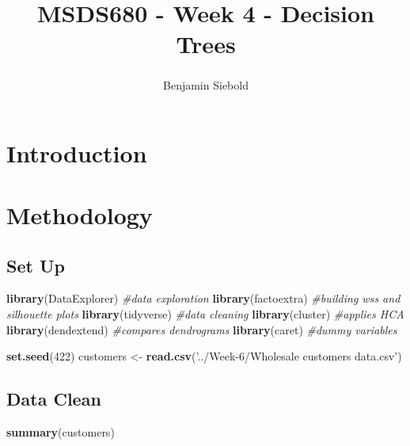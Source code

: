 \documentclass[
  english,
  man]{apa6}
\title{MSDS680 - Week 4 - Decision Trees}
\author{Benjamin Siebold\textsuperscript{}}
\date{}
\affiliation{\vspace{0.5cm}\textsuperscript{} Regis University}
\newenvironment{Shaded}{\begin{snugshade}}{\end{snugshade}}
\newcommand{\CommentTok}[1]{\textcolor[rgb]{0.56,0.35,0.01}{\textit{#1}}}
\newcommand{\DecValTok}[1]{\textcolor[rgb]{0.00,0.00,0.81}{#1}}
\newcommand{\KeywordTok}[1]{\textcolor[rgb]{0.13,0.29,0.53}{\textbf{#1}}}
\newcommand{\NormalTok}[1]{#1}
\newcommand{\StringTok}[1]{\textcolor[rgb]{0.31,0.60,0.02}{#1}}
\begin{document}
\maketitle

\hypertarget{introduction}{%
\section{Introduction}\label{introduction}}

\hypertarget{methodology}{%
\section{Methodology}\label{methodology}}

\hypertarget{set-up}{%
\subsection{Set Up}\label{set-up}}

\begin{Shaded}
\begin{Highlighting}[]
\KeywordTok{library}\NormalTok{(DataExplorer) }\CommentTok{#data exploration}
\KeywordTok{library}\NormalTok{(factoextra) }\CommentTok{#building wss and silhouette plots}
\KeywordTok{library}\NormalTok{(tidyverse) }\CommentTok{#data cleaning}
\KeywordTok{library}\NormalTok{(cluster) }\CommentTok{#applies HCA}
\KeywordTok{library}\NormalTok{(dendextend) }\CommentTok{#compares dendrograms}
\KeywordTok{library}\NormalTok{(caret) }\CommentTok{#dummy variables}

\KeywordTok{set.seed}\NormalTok{(}\DecValTok{422}\NormalTok{)}
\NormalTok{customers <-}\StringTok{ }\KeywordTok{read.csv}\NormalTok{(}\StringTok{'../Week-6/Wholesale customers data.csv'}\NormalTok{)}
\end{Highlighting}
\end{Shaded}

\hypertarget{data-clean}{%
\subsection{Data Clean}\label{data-clean}}

\begin{Shaded}
\begin{Highlighting}[]
\KeywordTok{summary}\NormalTok{(customers)}
\end{Highlighting}
\end{Shaded}
\end{document}
